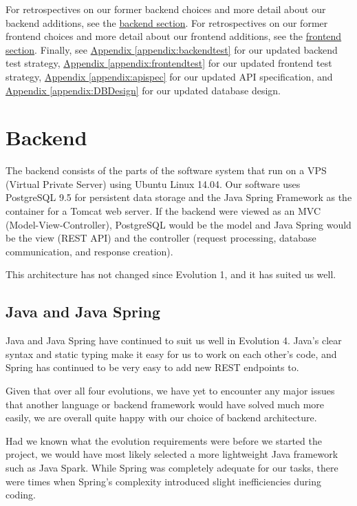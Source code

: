 \documentclass[12pt]{article}
\begin{document}
For retrospectives on our former backend choices and more detail about our backend additions, see the \hyperref[sec:Backend]{backend section}. For retrospectives on our former frontend choices and more detail about our frontend additions, see the \hyperref[sec:Frontend]{frontend section}. Finally, see \hyperref[appendix:backendtest]{Appendix \ref{appendix:backendtest}} for our updated backend test strategy,  \hyperref[appendix:frontendtest]{Appendix \ref{appendix:frontendtest}} for our updated frontend test strategy, \hyperref[appendix:apispec]{Appendix \ref{appendix:apispec}} for our updated API specification, and \hyperref[appendix:DBDesign]{Appendix \ref{appendix:DBDesign}} for our updated database design. 

\section{Backend}

\label{sec:Backend}
The backend consists of the parts of the software system that run on a VPS (Virtual Private Server) using Ubuntu Linux 14.04. Our software uses PostgreSQL 9.5 for persistent data storage and the Java Spring Framework as the container for a Tomcat web server. If the backend were viewed as an MVC (Model-View-Controller), PostgreSQL would be the model and Java Spring would be the view (REST API) and the controller (request processing, database communication, and response creation). 

This architecture has not changed since Evolution 1, and it has suited us well. 

\subsection{Java and Java Spring}
Java and Java Spring have continued to suit us well in Evolution 4. Java's clear syntax and static typing make it easy for us to work on each other's code, and Spring has continued to be very easy to add new REST endpoints to. 

Given that over all four evolutions, we have yet to encounter any major issues that another language or backend framework would have solved much more easily, we are overall quite happy with our choice of backend architecture. 

Had we known what the evolution requirements were before we started the project, we would have most likely selected a more lightweight Java framework such as Java Spark. While Spring was completely adequate for our tasks, there were times when Spring's complexity introduced slight inefficiencies during coding. 
\end{document}
